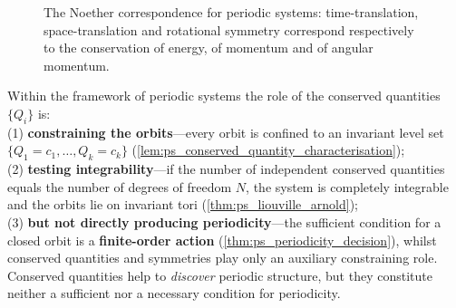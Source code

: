 \begin{figure}[htbp]
\centering
{}
\caption{The Noether correspondence for periodic systems: time-translation, space-translation and rotational symmetry correspond respectively to the conservation of energy, of momentum and of angular momentum.}
\label{fig:ps_noether}
\end{figure}

\begin{remark}\label{rem:ps_conservation_role}
Within the framework of periodic systems the role of the conserved quantities $\{Q_i\}$ is:\\
(1) \textbf{constraining the orbits}---every orbit is confined to an invariant level set $\{Q_1=c_1,\dots,Q_k=c_k\}$ (\cref{lem:ps_conserved_quantity_characterisation});\\
(2) \textbf{testing integrability}---if the number of independent conserved quantities equals the number of degrees of freedom $N$, the system is completely integrable and the orbits lie on invariant tori (\cref{thm:ps_liouville_arnold});\\
(3) \textbf{but not directly producing periodicity}---the sufficient condition for a closed orbit is a \textbf{finite-order action} (\cref{thm:ps_periodicity_decision}), whilst conserved quantities and symmetries play only an auxiliary constraining role. Conserved quantities help to \emph{discover} periodic structure, but they constitute neither a sufficient nor a necessary condition for periodicity.
\end{remark}

